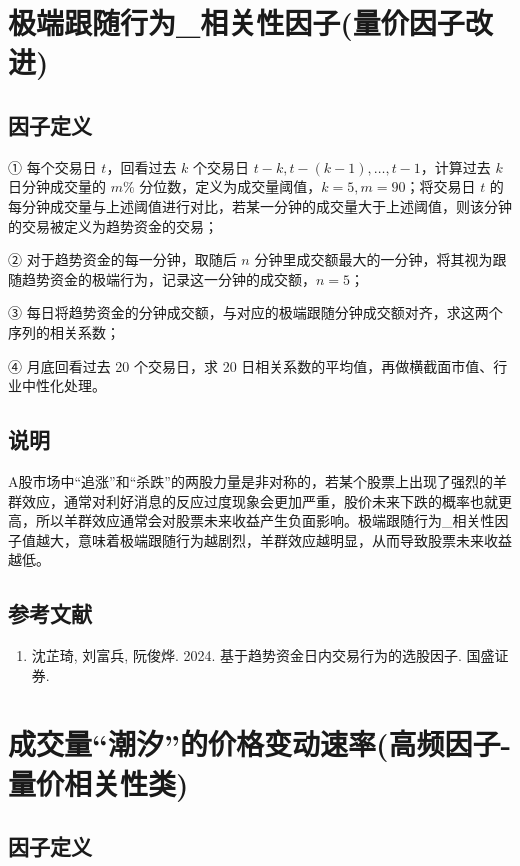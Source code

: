 \documentclass{article}
\begin{document}
\section{极端跟随行为\_相关性因子(量价因子改进)}

\subsection{因子定义}

① 每个交易日 \( t \)，回看过去 \( k \) 个交易日 \( t-k, t-(k-1), \dots, t-1 \)，计算过去 \( k \) 日分钟成交量的 \( m\% \) 分位数，定义为成交量阈值，\( k=5, m=90 \)；将交易日 \( t \) 的每分钟成交量与上述阈值进行对比，若某一分钟的成交量大于上述阈值，则该分钟的交易被定义为趋势资金的交易；

② 对于趋势资金的每一分钟，取随后 \( n \) 分钟里成交额最大的一分钟，将其视为跟随趋势资金的极端行为，记录这一分钟的成交额，\( n=5 \)；

③ 每日将趋势资金的分钟成交额，与对应的极端跟随分钟成交额对齐，求这两个序列的相关系数；

④ 月底回看过去 20 个交易日，求 20 日相关系数的平均值，再做横截面市值、行业中性化处理。

\subsection{说明}
A股市场中“追涨”和“杀跌”的两股力量是非对称的，若某个股票上出现了强烈的羊群效应，通常对利好消息的反应过度现象会更加严重，股价未来下跌的概率也就更高，所以羊群效应通常会对股票未来收益产生负面影响。极端跟随行为\_相关性因子值越大，意味着极端跟随行为越剧烈，羊群效应越明显，从而导致股票未来收益越低。

\subsection{参考文献}
\begin{enumerate}
    \item 沈芷琦, 刘富兵, 阮俊烨. 2024. 基于趋势资金日内交易行为的选股因子. 国盛证券.
\end{enumerate}

\section{成交量“潮汐”的价格变动速率(高频因子-量价相关性类)}

\subsection{因子定义}
\end{document}
